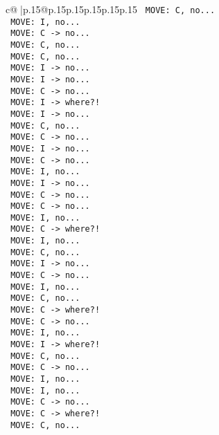 \documentclass{article}
\begin{document}
{\begin{supertabular}{c@{$\;$}|p{.15\linewidth}@{}p{.15\linewidth}p{.15\linewidth}p{.15\linewidth}p{.15\linewidth}p{.15\linewidth}}
{{{\texttt{ MOVE: C, no...} \\
\texttt{ MOVE: I, no...} \\
\texttt{ MOVE: C {-}> no...} \\
\texttt{ MOVE: C, no...} \\
\texttt{ MOVE: C, no...} \\
\texttt{ MOVE: I {-}> no...} \\
\texttt{ MOVE: I {-}> no...} \\
\texttt{ MOVE: C {-}> no...} \\
\texttt{ MOVE: I {-}> where?!} \\
\texttt{ MOVE: I {-}> no...} \\
\texttt{ MOVE: C, no...} \\
\texttt{ MOVE: C {-}> no...} \\
\texttt{ MOVE: I {-}> no...} \\
\texttt{ MOVE: C {-}> no...} \\
\texttt{ MOVE: I, no...} \\
\texttt{ MOVE: I {-}> no...} \\
\texttt{ MOVE: C {-}> no...} \\
\texttt{ MOVE: C {-}> no...} \\
\texttt{ MOVE: I, no...} \\
\texttt{ MOVE: C {-}> where?!} \\
\texttt{ MOVE: I, no...} \\
\texttt{ MOVE: C, no...} \\
\texttt{ MOVE: I {-}> no...} \\
\texttt{ MOVE: C {-}> no...} \\
\texttt{ MOVE: I, no...} \\
\texttt{ MOVE: C, no...} \\
\texttt{ MOVE: C {-}> where?!} \\
\texttt{ MOVE: C {-}> no...} \\
\texttt{ MOVE: I, no...} \\
\texttt{ MOVE: I {-}> where?!} \\
\texttt{ MOVE: C, no...} \\
\texttt{ MOVE: C {-}> no...} \\
\texttt{ MOVE: I, no...} \\
\texttt{ MOVE: I, no...} \\
\texttt{ MOVE: C {-}> no...} \\
\texttt{ MOVE: C {-}> where?!} \\
\texttt{ MOVE: C, no...} \\
}}}
\end{supertabular}}
\end{document}

